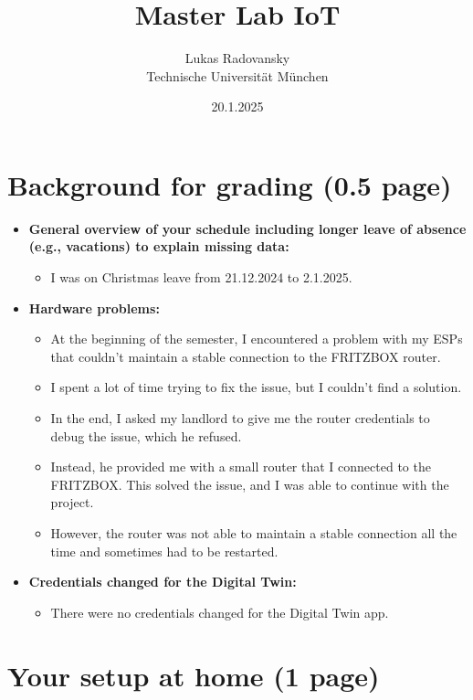 \documentclass[A4,10pt]{article}
\author{Lukas Radovansky \\ Technische Universit\"at M\"unchen}
\title{Master Lab IoT}
\date{20.1.2025}
\begin{document}
\maketitle
\newpage
\tableofcontents
\newpage

\section{Background for grading (0.5 page)}
\begin{itemize}
	\item \textbf{General overview of your schedule including longer leave of absence (e.g., vacations) to explain missing data:}
	\begin{itemize}
		\item I was on Christmas leave from 21.12.2024 to 2.1.2025.
	\end{itemize}

	\item \textbf{Hardware problems:}
	\begin{itemize}
		\item At the beginning of the semester, I encountered a problem with my ESPs that couldn't maintain a stable connection to the FRITZBOX router.
		\item I spent a lot of time trying to fix the issue, but I couldn't find a solution.
		\item In the end, I asked my landlord to give me the router credentials to debug the issue, which he refused.
		\item Instead, he provided me with a small router that I connected to the FRITZBOX. This solved the issue, and I was able to continue with the project.
		\item However, the router was not able to maintain a stable connection all the time and sometimes had to be restarted.
	\end{itemize}

	\item \textbf{Credentials changed for the Digital Twin:}
	\begin{itemize}
		\item There were no credentials changed for the Digital Twin app.
	\end{itemize}
\end{itemize}

\section{Your setup at home (1 page)}
\end{document}
